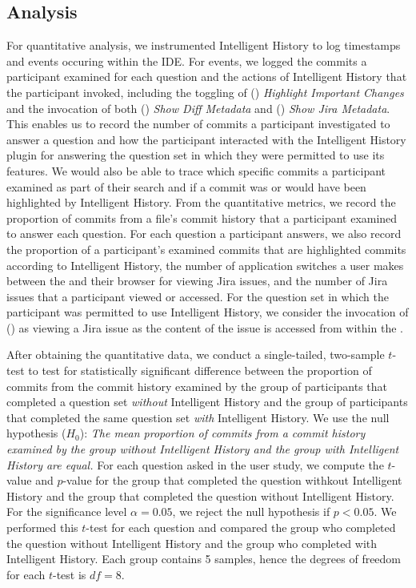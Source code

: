 \subsection{Analysis}
\label{subsec:Analysis}

For quantitative analysis, we instrumented Intelligent History to log timestamps and events occuring within the IDE.
For events, we logged the commits a participant examined for each question and the actions of Intelligent History that the participant invoked,
including the toggling of () \textit{Highlight Important Changes} and the invocation of both () \textit{Show Diff Metadata} and () \textit{Show Jira Metadata}.
This enables us to record the number of commits a participant investigated to answer a question and how the participant interacted with the Intelligent History plugin for answering the question set in which they were permitted to use its features.
We would also be able to trace which specific commits a participant examined as part of their search and if a commit was or would have been highlighted by Intelligent History.
From the quantitative metrics, we record the proportion of commits from a file's commit history that a participant examined to answer each question.
For each question a participant answers, we also record the proportion of a participant's examined commits that are highlighted commits according to Intelligent History,
the number of application switches a user makes between the  and their browser for viewing Jira issues,
and the number of Jira issues that a participant viewed or accessed.
For the question set in which the participant was permitted to use Intelligent History, 
we consider the invocation of () as viewing a Jira issue as the content of the issue is accessed from within the .

After obtaining the quantitative data, we conduct a single-tailed, two-sample $t$-test to test for statistically significant difference between the proportion of commits from the commit history examined by the group of participants that completed a question set \emph{without} Intelligent History and the group of participants that completed the same question set \emph{with} Intelligent History.
We use the null hypothesis ($H_{0}$): 
\textit{The mean proportion of commits from a commit history examined by the group without Intelligent History and the group with Intelligent History are equal.}
For each question asked in the user study, we compute the $t$-value and $p$-value for the group that completed the question withkout Intelligent History and the group that completed the question without Intelligent History.
For the significance level $\alpha = 0.05$, we reject the null hypothesis if $p < 0.05$.
We performed this $t$-test for each question and compared the group who completed the question without Intelligent History and the group who completed with Intelligent History.
Each group contains 5 samples, hence the degrees of freedom for each $t$-test is $df = 8$.

